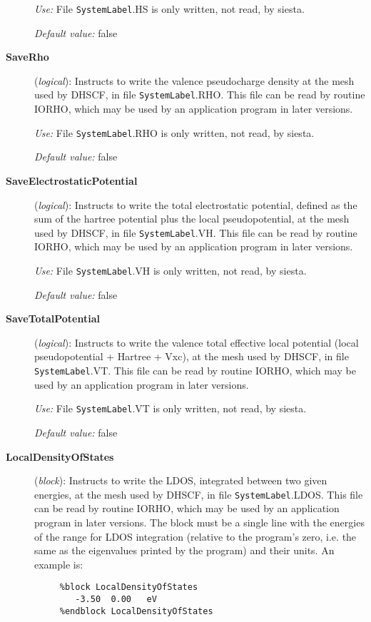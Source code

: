 \begin{description}
{\it Use:} File {\tt SystemLabel}.HS is only written, not read, by siesta.

{\it Default value:} false
        

\item[{\bf SaveRho}] ({\it logical}): 
Instructs to write the valence pseudocharge density at the
mesh used by DHSCF,
in file {\tt SystemLabel}.RHO. This file can be read by routine IORHO,
which may be used by an application program in later versions.

{\it Use:} File {\tt SystemLabel}.RHO is only written, not read, by siesta.

{\it Default value:} false
        

\item[{\bf SaveElectrostaticPotential}] ({\it logical}): 
Instructs to write the total electrostatic potential, defined as the
sum of the hartree potential plus the local pseudopotential, at the
mesh used by DHSCF,
in file {\tt SystemLabel}.VH. This file can be read by routine IORHO,
which may be used by an application program in later versions.

{\it Use:} File {\tt SystemLabel}.VH is only written, not read, by siesta.

{\it Default value:} false
        

\item[{\bf SaveTotalPotential}] ({\it logical}): 
Instructs to write the valence total effective local potential
(local pseudopotential + Hartree + Vxc), at the
mesh used by DHSCF,
in file {\tt SystemLabel}.VT. This file can be read by routine IORHO,
which may be used by an application program in later versions.

{\it Use:} File {\tt SystemLabel}.VT is only written, not read, by siesta.

{\it Default value:} false
        

\item[{\bf LocalDensityOfStates}] ({\it block}): 
Instructs to write the LDOS, integrated between two given energies,
at the mesh used by DHSCF,
in file {\tt SystemLabel}.LDOS. This file can be read by routine IORHO,
which may be used by an application program in later versions.
The block must be a single line with the energies of the range for 
LDOS integration
(relative to the program's zero, i.e. the same as the eigenvalues
printed by the program) and their units.
An example is:

\begin{verbatim}
     %block LocalDensityOfStates
        -3.50  0.00   eV
     %endblock LocalDensityOfStates
\end{verbatim}


\end{description}
